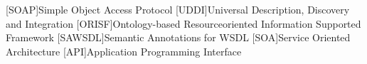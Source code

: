 
[SOAP]{Simple Object Access Protocol}
[UDDI]{Universal Description, Discovery and Integration}
[ORISF]{Ontology-based Resourceoriented Information Supported Framework}
[SAWSDL]{Semantic Annotations for WSDL}
[SOA]{Service Oriented Architecture}
[API]{Application Programming Interface}
